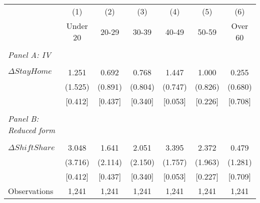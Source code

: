 \begin{tabular}{l*{6}{c}} \toprule
            &\multicolumn{1}{c}{(1)}&\multicolumn{1}{c}{(2)}&\multicolumn{1}{c}{(3)}&\multicolumn{1}{c}{(4)}&\multicolumn{1}{c}{(5)}&\multicolumn{1}{c}{(6)}\\
            &\multicolumn{1}{c}{Under 20}&\multicolumn{1}{c}{20-29}&\multicolumn{1}{c}{30-39}&\multicolumn{1}{c}{40-49}&\multicolumn{1}{c}{50-59}&\multicolumn{1}{c}{Over 60}\\
\hline \\ \multicolumn{1}{l}{\textit{Panel A: IV}} \\\\[-1ex]
$\Delta StayHome$&       1.251&       0.692&       0.768&       1.447&       1.000&       0.255\\
            &     (1.525)&     (0.891)&     (0.804)&     (0.747)&     (0.826)&     (0.680)\\
            &     [0.412]&     [0.437]&     [0.340]&     [0.053]&     [0.226]&     [0.708]\\
\hline \\ \multicolumn{1}{l}{\textit{Panel B: Reduced form}} \\\\[-1ex]
$\Delta ShiftShare$&       3.048&       1.641&       2.051&       3.395&       2.372&       0.479\\
            &     (3.716)&     (2.114)&     (2.150)&     (1.757)&     (1.963)&     (1.281)\\
            &     [0.412]&     [0.437]&     [0.340]&     [0.053]&     [0.227]&     [0.709]\\
\hline
Observations&       1,241&       1,241&       1,241&       1,241&       1,241&       1,241\\
\bottomrule \end{tabular}
